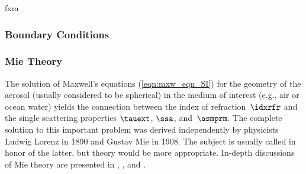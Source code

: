 \documentclass[12pt]{article}
\begin{document}
fxm

\subsubsection[Boundary Conditions]{Boundary Conditions}\label{sxn:bc}

\subsubsection[Mie Theory]{Mie Theory}\label{sxn:mie}
The solution of Maxwell's equations (\ref{eqn:mxw_eqn_SI}) for the
geometry of the aerosol (usually considered to be spherical) in the
medium of interest (e.g., air or ocean water) yields the connection
between the index of refraction~$\idxrfr$ and the single scattering
properties $\tauext$, $\ssa$, and~$\asmprm$.
The complete solution to this important problem was derived
independently by physicists Ludwig Lorenz in 1890 and Gustav Mie in
1908.
The subject is usually called  in honor of the
latter, but  theory would be more appropriate.
In-depth discussions of Mie theory are presented in \cite{Van57},
\cite{HaT74}, and \cite{BoH83}.
\end{document}
